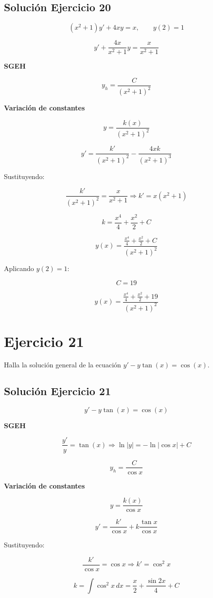 \documentclass[12pt]{article}
\begin{document}
\subsection*{Solución Ejercicio 20}

\[
(x^2+1)y' + 4xy = x,
\qquad y(2)=1
\]

\[
y' + \frac{4x}{x^2+1}y = \frac{x}{x^2+1}
\]

\textbf{SGEH}

\[
y_h = \frac{C}{(x^2+1)^2}
\]

\textbf{Variación de constantes}

\[
y = \frac{k(x)}{(x^2+1)^2}
\]

\[
y' = \frac{k'}{(x^2+1)^2} - \frac{4xk}{(x^2+1)^3}
\]

Sustituyendo:

\[
\frac{k'}{(x^2+1)^2} = \frac{x}{x^2+1}
\Rightarrow
k' = x(x^2+1)
\]

\[
k = \frac{x^4}{4} + \frac{x^2}{2} + C
\]

\[
y(x) = \frac{\frac{x^4}{4}+\frac{x^2}{2}+C}{(x^2+1)^2}
\]

Aplicando \(y(2)=1\):

\[
C = 19
\]

\[
\boxed{
y(x) =
\dfrac{\frac{x^4}{4}+\frac{x^2}{2}+19}{(x^2+1)^2}
}
\]

\section*{Ejercicio 21}
Halla la solución general de la ecuación $y' - y \tan(x) = \cos(x)$.

\subsection*{Solución Ejercicio 21}

\[
y' - y\tan(x) = \cos(x)
\]

\textbf{SGEH}

\[
\frac{y'}{y} = \tan(x)
\Rightarrow
\ln|y| = -\ln|\cos x| + C
\]

\[
y_h = \frac{C}{\cos x}
\]

\textbf{Variación de constantes}

\[
y = \frac{k(x)}{\cos x}
\]

\[
y' = \frac{k'}{\cos x} + k\frac{\tan x}{\cos x}
\]

Sustituyendo:

\[
\frac{k'}{\cos x} = \cos x
\Rightarrow
k' = \cos^2 x
\]

\[
k = \int \cos^2 x\,dx
= \frac{x}{2} + \frac{\sin 2x}{4} + C
\]
\end{document}
